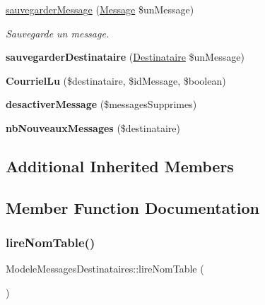 \begin{DoxyCompactItemize}
\item 
\hyperlink{class_modele_messages_destinataires_a559f56ecfe8cc751b932fac36171f1a9}{sauvegarder\+Message} (\hyperlink{class_message}{Message} \$un\+Message)
\begin{DoxyCompactList}\small\item\em Sauvegarde un message. \end{DoxyCompactList}\item 
\mbox{\label{class_modele_messages_destinataires_afeb71f5a03d18338de6b1a54a3226e0d}} 
{\bfseries sauvegarder\+Destinataire} (\hyperlink{class_destinataire}{Destinataire} \$un\+Message)
\item 
\mbox{\label{class_modele_messages_destinataires_a42e74a2e88da8d9adfc54f0cf0602587}} 
{\bfseries Courriel\+Lu} (\$destinataire, \$id\+Message, \$boolean)
\item 
\mbox{\label{class_modele_messages_destinataires_a7335224d85ae7f8709f1b3920bafd5b5}} 
{\bfseries desactiver\+Message} (\$messages\+Supprimes)
\item 
\mbox{\label{class_modele_messages_destinataires_a092cf90d16e9ff3a3d67f9f3d6036d07}} 
{\bfseries nb\+Nouveaux\+Messages} (\$destinataire)
\end{DoxyCompactItemize}
\subsection*{Additional Inherited Members}


\subsection{Member Function Documentation}
\mbox{\label{class_modele_messages_destinataires_ad3f71c65c8a33b4fdeb2373ba3de2722}} 
\subsubsection{\texorpdfstring{lire\+Nom\+Table()}{lireNomTable()}}
{\footnotesize\ttfamily Modele\+Messages\+Destinataires\+::lire\+Nom\+Table (\begin{DoxyParamCaption}{ }\end{DoxyParamCaption})}



